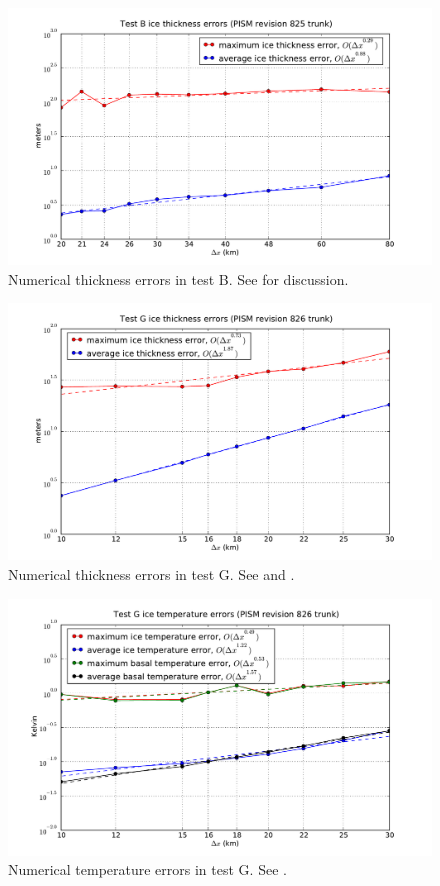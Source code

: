 \documentclass[11pt,final]{amsart}
\begin{document}
\begin{figure}[ht]
\includegraphics[width=4.8in,keepaspectratio=true]{test-B-thickness}
\caption{Numerical thickness errors in test B. See \cite{BLKCB} for discussion.}
\label{fig:thickerrsB}
\end{figure}

\begin{figure}[ht]
\includegraphics[width=5.0in,keepaspectratio=true]{test-G-thickness}
\caption{Numerical thickness errors in test G.  See \cite{BBL} and \cite{BLKCB}.}
\label{fig:thickerrsG}
\end{figure}

\begin{figure}[ht]
\includegraphics[width=5.0in,keepaspectratio=true]{test-G-temp}
\caption{Numerical temperature errors in test G. See \cite{BBL}.}
\label{fig:temperrsG}
\end{figure}
\end{document}
